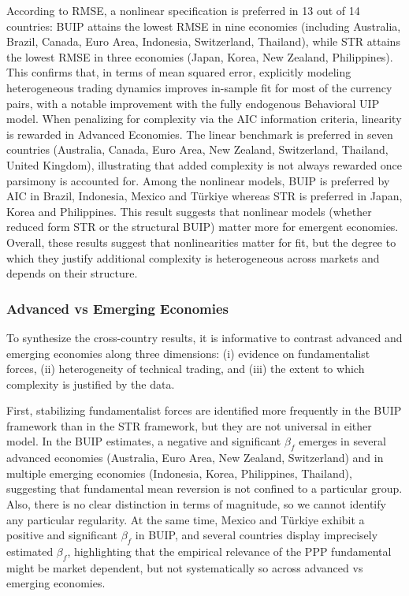 \documentclass[a4paper,10pt,final]{article}    %
\begin{document}
According to RMSE, a nonlinear specification is preferred in 13 out of 14 countries: BUIP attains the lowest RMSE in nine economies (including Australia, Brazil, Canada, Euro Area, Indonesia, Switzerland, Thailand), while STR attains the lowest RMSE in three economies (Japan, Korea, New Zealand, Philippines). This confirms that, in terms of mean squared error, explicitly modeling heterogeneous trading dynamics improves in-sample fit for most of the currency pairs, with a notable improvement with the fully endogenous Behavioral UIP model. When penalizing for complexity via the AIC information criteria, linearity is rewarded in Advanced Economies. The linear benchmark is preferred in seven countries (Australia, Canada, Euro Area, New Zealand, Switzerland, Thailand, United Kingdom), illustrating that added complexity is not always rewarded once parsimony is accounted for. Among the nonlinear models, BUIP is preferred by AIC in Brazil, Indonesia, Mexico and Türkiye whereas STR is preferred in Japan, Korea and Philippines. This result suggests that nonlinear models (whether reduced form STR or the structural BUIP) matter more for emergent economies. Overall, these results suggest that nonlinearities matter for fit, but the degree to which they justify additional complexity is heterogeneous across markets and depends on their structure.

\subsubsection{Advanced vs Emerging Economies}

To synthesize the cross-country results, it is informative to contrast advanced and emerging economies along three dimensions: (i) evidence on fundamentalist forces, (ii) heterogeneity of technical trading, and (iii) the extent to which complexity is justified by the data.

First, stabilizing fundamentalist forces are identified more frequently in the BUIP framework than in the STR framework, but they are not universal in either model. In the BUIP estimates, a negative and significant $\beta_f$ emerges in several advanced economies (Australia, Euro Area, New Zealand, Switzerland) and in multiple emerging economies (Indonesia, Korea, Philippines, Thailand), suggesting that fundamental mean reversion is not confined to a particular group. Also, there is no clear distinction in terms of magnitude, so we cannot identify any particular regularity. At the same time, Mexico and Türkiye exhibit a positive and significant $\beta_f$ in BUIP, and several countries display imprecisely estimated $\beta_f$, highlighting that the empirical relevance of the PPP fundamental might be market dependent, but not systematically so across advanced vs emerging economies.
\end{document}
